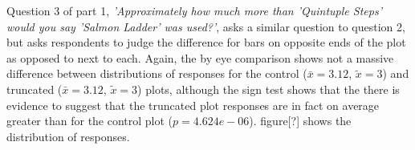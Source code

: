 \documentclass[
]{article}
\newenvironment{Shaded}{\begin{snugshade}}{\end{snugshade}}
\newcommand{\DecValTok}[1]{\textcolor[rgb]{0.00,0.00,0.81}{#1}}
\newcommand{\KeywordTok}[1]{\textcolor[rgb]{0.13,0.29,0.53}{\textbf{#1}}}
\newcommand{\NormalTok}[1]{#1}
\newcommand{\OperatorTok}[1]{\textcolor[rgb]{0.81,0.36,0.00}{\textbf{#1}}}
\newcommand{\StringTok}[1]{\textcolor[rgb]{0.31,0.60,0.02}{#1}}
\begin{document}
Question 3 of part 1,
\textit{'Approximately how much more than 'Quintuple Steps' would you say 'Salmon Ladder' was used?'},
asks a similar question to question 2, but asks respondents to judge the
difference for bars on opposite ends of the plot as opposed to next to
each. Again, the by eye comparison shows not a massive difference
between distributions of responses for the control (\(\bar{x}=3.12\),
\(\tilde{x}=3\)) and truncated (\(\bar{x}=3.12\), \(\tilde{x}=3\))
plots, although the sign test shows that the there is evidence to
suggest that the truncated plot responses are in fact on average greater
than for the control plot (\(p=4.624e-06\)). figure{[}?{]} shows the
distribution of responses.

\begin{Shaded}
\end{Shaded}
\end{document}
